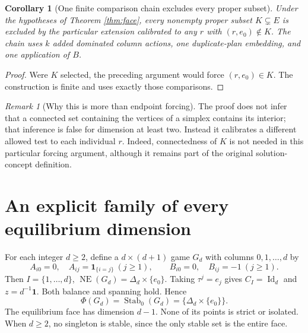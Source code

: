\documentclass[11pt]{article}
\newcommand{\NE}{\operatorname{NE}}
\newcommand{\Stab}{\operatorname{Stab}_0}
\newcommand{\one}{\mathbf 1}
\newtheorem{corollary}[theorem]{Corollary}
\theoremstyle{definition}
\theoremstyle{remark}
\newtheorem{remark}[theorem]{Remark}
\begin{document}
\begin{corollary}[One finite comparison chain excludes every proper subset]
Under the hypotheses of Theorem \ref{thm:face}, every nonempty proper
subset $K\subsetneq E$ is excluded by the particular extension calibrated
to any $r$ with $(r,e_0)\notin K$. The chain uses $k$ added dominated
column actions, one duplicate-plan embedding, and one application of $B$.
\end{corollary}
\begin{proof}
Were $K$ selected, the preceding argument would force $(r,e_0)\in K$.
The construction is finite and uses exactly those comparisons.
\end{proof}

\begin{remark}[Why this is more than endpoint forcing]
The proof does not infer that a connected set containing the vertices
of a simplex contains its interior; that inference is false for dimension
at least two. Instead it calibrates a different allowed test to each
individual $r$. Indeed, connectedness of $K$ is not needed in this
particular forcing argument, although it remains part of the original
solution-concept definition.
\end{remark}


\section{An explicit family of every equilibrium dimension}
For each integer $d\ge2$, define a $d\times(d+1)$ game $G_d$ with
columns $0,1,\ldots,d$ by
\begin{equation}\label{eq:canonical}
 A_{i0}=0,\quad A_{ij}=\mathbf1_{\{i=j\}}\ (j\ge1),\qquad
 B_{i0}=0,\quad B_{ij}=-1\ (j\ge1).
\end{equation}
Then $I=\{1,\ldots,d\}$, $\NE(G_d)=\Delta_d\times\{e_0\}$.
Taking $\tau^j=e_j$ gives $C_I=\operatorname{Id}_d$ and
$z=d^{-1}\one$. Both balance and spanning hold. Hence
\[
 \Phi(G_d)=\Stab(G_d)=\{\Delta_d\times\{e_0\}\}.
\]
The equilibrium face has dimension $d-1$. None of its points is strict
or isolated. When $d\ge2$, no singleton is stable, since the only stable
set is the entire face.
\end{document}
